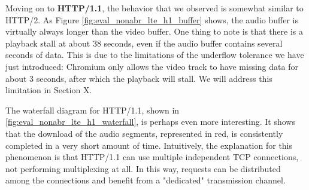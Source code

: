 Moving on to \textbf{HTTP/1.1}, the behavior that we observed is somewhat similar to HTTP/2. As Figure \ref{fig:eval_nonabr_lte_h1_buffer} shows, the audio buffer is virtually always longer than the video buffer. One thing to note is that there is a playback stall at about 38 seconds, even if the audio buffer contains several seconds of data. This is due to the limitations of the underflow tolerance we have just introduced: Chromium only allows the video track to have missing data for about 3 seconds, after which the playback will stall. We will address this limitation in Section X.

The waterfall diagram for HTTP/1.1, shown in \ref{fig:eval_nonabr_lte_h1_waterfall}, is perhaps even more interesting. It shows that the download of the audio segments, represented in red, is consistently completed in a very short amount of time. Intuitively, the explanation for this phenomenon is that HTTP/1.1 can use multiple independent TCP connections, not performing multiplexing at all. In this way, requests can be distributed among the connections and benefit from a "dedicated" transmission channel.


